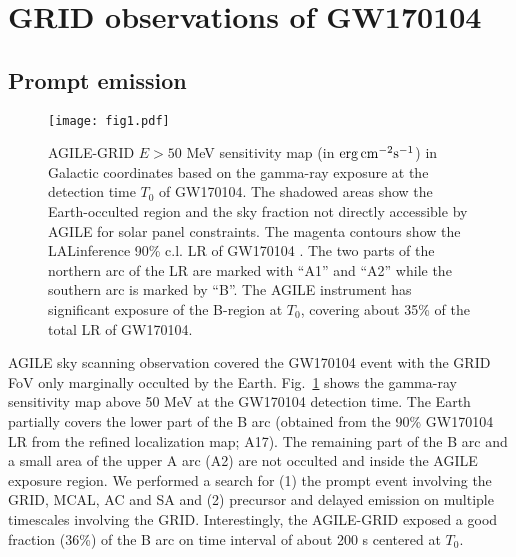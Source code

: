 \documentclass[preprint2]{aastex}
\def\gw {GW170104 }
\def\gwp {GW170104}
\def \fv {}
\begin{document}
\section{GRID observations of \gw}

\subsection{Prompt emission}


\begin{figure}[t]
   \centerline{\texttt{[image: fig1.pdf]}}
    \caption{AGILE-GRID $E > 50$ MeV sensitivity map {\fv (in $\rm erg\, cm^{-2} s^{-1}$)} in Galactic coordinates based on the
     gamma-ray exposure at the detection time $T_0$ of \gwp.
The shadowed areas show the Earth-occulted region and the sky fraction not directly accessible by
AGILE for solar panel constraints. The magenta contours show the {\fv LALinference} 90\% {\fv c.l. LR} of \gw \cite[][]{2017GCN..20385...1G}.
    The two parts of the northern arc of the LR
 are marked with ``A1'' and ``A2'' while the southern arc is marked by ``B''.
The AGILE instrument has significant exposure of the B-region at
$T_0$, covering about 35\% of the total LR of \gwp.}
 \label{fig-1}
 \end{figure}

AGILE sky scanning observation covered the \gw event \cite[at time
$T_0$\,=\,10:11:58.599 UTC on 2017 January 4;][]{2017GCN..20364...1S}
with the GRID FoV only marginally
occulted by the Earth. Fig.~\ref{fig-1} shows the gamma-ray
{\fv sensitivity map} above 50 MeV at the \gw {\fv detection} time.
 The Earth partially
covers the lower part of the B arc (obtained from the 90\% \gw LR
from the refined localization map; A17).
The remaining part of the B arc and a small area of the upper
A arc (A2) are not occulted and inside the AGILE exposure region.
We performed a search for (1) the prompt event involving the
GRID, MCAL, AC and SA and
(2) precursor and delayed emission on multiple timescales
involving the GRID.
%
%
{\fv Interestingly}, the AGILE-GRID exposed a good fraction (36\%) of the
B arc on time interval of about 200 s centered at $T_0$.
%
\end{document}

